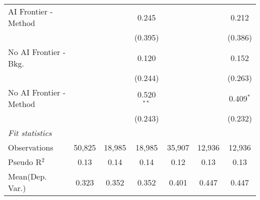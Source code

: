 \begin{tabular}{lcccccc}
   AI Frontier - Method    &               &               & 0.245         &               &               & 0.212\\   
                           &               &               & (0.395)       &               &               & (0.386)\\   
   No AI Frontier - Bkg.   &               &               & 0.120         &               &               & 0.152\\   
                           &               &               & (0.244)       &               &               & (0.263)\\   
   No AI Frontier - Method &               &               & 0.520$^{**}$  &               &               & 0.409$^{*}$\\   
                           &               &               & (0.243)       &               &               & (0.232)\\   
   \midrule
   \emph{Fit statistics}\\
   Observations            & 50,825        & 18,985        & 18,985        & 35,907        & 12,936        & 12,936\\  
   Pseudo R$^2$            & 0.13          & 0.14          & 0.14          & 0.12          & 0.13          & 0.13\\  
Mean(Dep. Var.) & 0.323 & 0.352 & 0.352 & 0.401 & 0.447 & 0.447 \\
   

\end{tabular}

